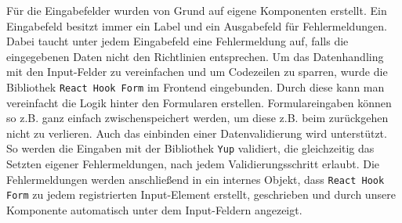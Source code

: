 \documentclass[conference,a4paper,flushend]{cs-techrep}
\begin{document}
\begin{enumerate}
Für die Eingabefelder wurden von Grund auf eigene Komponenten erstellt. Ein Eingabefeld besitzt immer ein Label und ein Ausgabefeld für Fehlermeldungen. Dabei taucht unter jedem Eingabefeld eine Fehlermeldung auf, falls die eingegebenen Daten nicht den Richtlinien entsprechen. 
Um das Datenhandling mit den Input-Felder zu vereinfachen und um Codezeilen zu sparren, wurde die Bibliothek \texttt{React Hook Form} \cite{noauthor_home_nodate} im Frontend eingebunden. Durch diese kann man vereinfacht die Logik hinter den Formularen erstellen. 
Formulareingaben können so z.B. ganz einfach zwischenspeichert werden, um diese z.B. beim zurückgehen nicht zu verlieren. Auch das einbinden einer Datenvalidierung wird unterstützt. So werden die Eingaben mit der Bibliothek \texttt{Yup} \cite{quense_jquenseyup_2024} validiert, die gleichzeitig das Setzten eigener Fehlermeldungen, nach jedem Validierungsschritt erlaubt. Die Fehlermeldungen werden anschließend in ein internes Objekt, dass \texttt{React Hook Form} zu jedem registrierten Input-Element erstellt, geschrieben und durch unsere Komponente automatisch unter dem Input-Feldern angezeigt. 


\end{enumerate}
\end{document}
